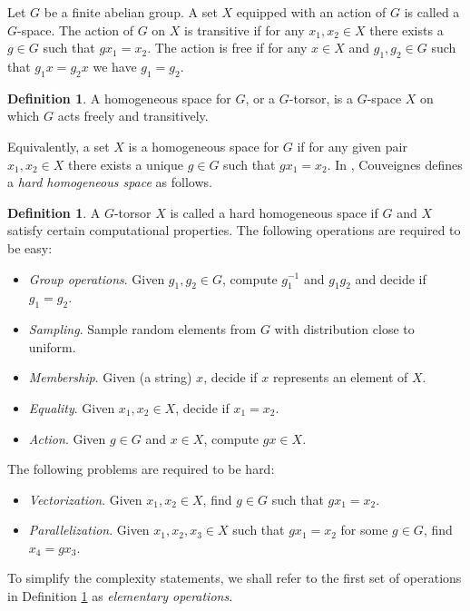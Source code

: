 \documentclass[11pt]{article}
\theoremstyle{plain}
\theoremstyle{definition}
\newtheorem{definition}[theorem]{Definition}
\begin{document}
Let $G$ be a finite abelian group. A set $X$ equipped with an action of $G$ is called a $G$-space. 
The action of $G$ on $X$ is transitive if for any $x_1, x_2 \in X$ there exists a $g \in 
G$ such that $gx_1 = x_2$. The action is free if for any $x \in X$ and $g_1, g_2 \in G$ such that 
$g_1x = g_2x$ we have $g_1 = g_2$. 
\begin{definition}
	A homogeneous space for $G$, or a $G$-torsor, is a $G$-space $X$ on which $G$ acts freely and 
	transitively.
\end{definition}
Equivalently, a set $X$ is a homogeneous space for $G$ if for any given pair $x_1, x_2 \in X$ there 
exists a unique $g \in G$ such that $gx_1 = x_2$. In \cite{couveignes2006hard}, Couveignes defines a 
\textit{hard homogeneous space} as follows.
\begin{definition}
\label{def:hhs}
	A $G$-torsor $X$ is called a hard homogeneous space if $G$ and $X$ satisfy certain 
	computational properties. The following operations are required to be easy:
	\begin{itemize}[topsep = 0pt, itemsep = 0pt, parsep = 0pt]
		\item \textit{Group operations}. Given $g_1, g_2 \in G$, compute $g_1^{-1}$ and $g_1g_2$ 
		and decide if $g_1 = g_2$.
		\item \textit{Sampling}. Sample random elements from $G$ with distribution close to uniform.
		\item \textit{Membership}. Given (a string) $x$, decide if $x$ represents an element of $X$.
		\item \textit{Equality}. Given $x_1, x_2 \in X$, decide if $x_1 = x_2$.
		\item \textit{Action}. Given $g \in G$ and $x \in X$, compute $gx \in X$.
	\end{itemize}
	The following problems are required to be hard:
	\begin{itemize}[topsep = 0pt, itemsep = 0pt, parsep = 0pt]
		\item \textit{Vectorization}. Given $x_1, x_2 \in X$, find $g \in G$ such that $gx_1 = x_2$.
		\item \textit{Parallelization}. Given $x_1, x_2, x_3 \in X$ such that $gx_1 = x_2$ for some 
		$g \in G$, find $x_4 = gx_3$.
	\end{itemize}
\end{definition}
To simplify the complexity statements, we shall refer to the first set of operations in Definition \ref{def:hhs} as \textit{elementary operations}.
\end{document}

